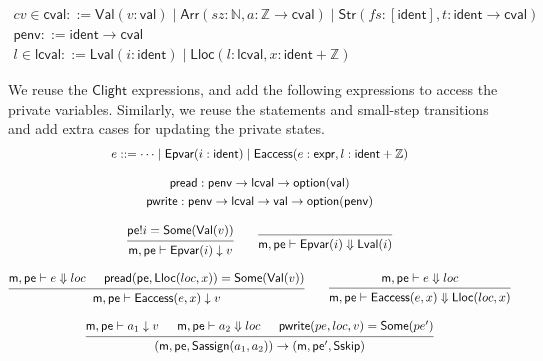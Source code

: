 \documentclass[acmsmall,screen,review,anonymous]{acmart}
\newcommand{\kw}[1]{\ensuremath{ \mathsf{#1} }}
\newcommand{\Clight}{\ensuremath{ \mathsf{Clight} }}
\begin{document}
\begin{gather*}
  cv \in \kw{cval} \mathrel{::=} \kw{Val}(v:\kw{val})
                     \mathrel{|} \kw{Arr}(sz:\mathbb{N},a:\mathbb{Z} \rightarrow \kw{cval})
                     \mathrel{|} \kw{Str}(fs:[\kw{ident}],t:\kw{ident} \rightarrow \kw{cval})
  \\
  \kw{penv} \mathrel{::=} \kw{ident} \rightarrow \kw{cval}
  \\
  l \in \kw{lcval} \mathrel{::=} \kw{Lval}(i: \kw{ident})
                          \mathrel{|} \kw{Lloc}(l:\kw{lcval}, x:\kw{ident}+\mathbb{Z})
\end{gather*}

We reuse the $\Clight$ expressions,
and add the following expressions to access the private variables.
Similarly, we reuse the statements and small-step transitions
and add extra cases for updating the private states.
\begin{gather*}
  e \mathrel{::=} \cdots \mathrel{|} \kw{Epvar}(i:\kw{ident})
  \mathrel{|} \kw{Eaccess}(e:\kw{expr}, l:\kw{ident}+\mathbb{Z})
  \\[2ex]
  \kw{pread} \mathrel{:} \kw{penv} \rightarrow \kw{lcval} \rightarrow \kw{option}(\kw{val})\\
  \kw{pwrite} \mathrel{:} \kw{penv} \rightarrow \kw{lcval} \rightarrow \kw{val} \rightarrow \kw{option}(\kw{penv})
  \\[2ex]
  {\begin{prooftree}
    \hypo{\kw{pe}!i = \kw{Some}(\kw{Val}(v))}
    \infer1{\kw{m},\kw{pe} \vdash \kw{Epvar}(i) \downarrow v}
  \end{prooftree}}
  \qquad
  {\begin{prooftree}
    \infer0{\kw{m},\kw{pe} \vdash \kw{Epvar}(i) \Downarrow \kw{Lval}(i)}
  \end{prooftree}}
  \\[2ex]
  {\begin{prooftree}
    \hypo{\kw{m}, \kw{pe} \vdash e \Downarrow loc}
    \hypo{\kw{pread}(\kw{pe}, \kw{Lloc}(loc, x)) = \kw{Some}(\kw{Val}(v))}
    \infer2{\kw{m},\kw{pe} \vdash \kw{Eaccess}(e, x) \downarrow v}
  \end{prooftree}}
  \qquad
  {\begin{prooftree}
    \hypo{\kw{m},\kw{pe} \vdash e \Downarrow loc}
    \infer1{\kw{m}, \kw{pe} \vdash \kw{Eaccess}(e, x) \Downarrow \kw{Lloc}(loc, x)}
  \end{prooftree}}
  \\[2ex]
  {\begin{prooftree}
    \hypo{\kw{m}, \kw{pe} \vdash a_1 \downarrow v}
    \hypo{\kw{m}, \kw{pe} \vdash a_2 \Downarrow loc}
    \hypo{\kw{pwrite}(pe, loc, v) = \kw{Some}(pe')}
    \infer3{(\kw{m}, \kw{pe}, \kw{Sassign}(a_1, a_2)) \rightarrow
      (\kw{m}, \kw{pe'}, \kw{Sskip})}
  \end{prooftree}}
\end{gather*}
\end{document}
